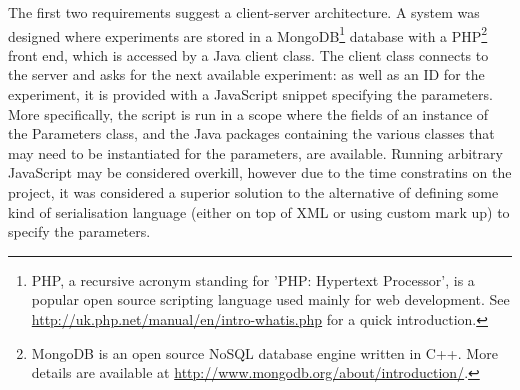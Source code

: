 The first two requirements suggest a client-server architecture.  A system was designed where experiments are stored in a MongoDB\footnote{PHP, a recursive acronym standing for 'PHP: Hypertext Processor', is a popular open source scripting language used mainly for web development.  See \url{http://uk.php.net/manual/en/intro-whatis.php} for a quick introduction.} database with a PHP\footnote{MongoDB is an open source NoSQL database engine written in C++.  More details are available at \url{http://www.mongodb.org/about/introduction/}.} front end, which is accessed by a Java client class.  The client class connects to the server and asks for the next available experiment: as well as an ID for the experiment, it is provided with a JavaScript snippet specifying the parameters.  More specifically, the script is run in a scope where the fields of an instance of the Parameters class, and the Java packages containing the various classes that may need to be instantiated for the parameters, are available.  Running arbitrary JavaScript may be considered overkill, however due to the time constratins on the project, it was considered a superior solution to the alternative of defining some kind of serialisation language (either on top of XML or using custom mark up) to specify the parameters.

